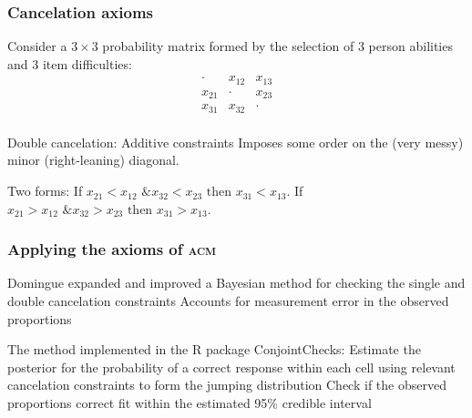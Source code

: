 \documentclass[10pt,serif,professionalfont]{beamer}
\begin{document}
\begin{frame} 
    \frametitle{Cancelation axioms}

    Consider a $3 \times 3$ probability matrix formed by the selection of 3 person abilities and 3 item difficulties:
    \[
    \begin{array}{ccc}
      \cdot&x_{12} &x_{13}  \\
      x_{21}&\cdot&x_{23} \\
      x_{31} & x_{32}&\cdot\\
    \end{array}
    \]

    \begin{outline}
        \1 Double cancelation: Additive constraints 
            \2 Imposes some order on the (very messy) minor (right-leaning) diagonal.  
        
        \vspace{0.1cm}
            
        \1 Two forms:
            \2 If $x_{21}<x_{12} \text{ \& } x_{32}<x_{23} \text{ then } x_{31}<x_{13}$.
            \2 If $x_{21}>x_{12} \text{ \& } x_{32}>x_{23} \text{ then } x_{31}>x_{13}$.

    \end{outline}

\end{frame}

\begin{frame}
    \frametitle{Applying the axioms of \textsc{acm}}

    \begin{outline}
        \1 Domingue expanded and improved a Bayesian method for checking the single and double cancelation constraints
            \2 Accounts for measurement error in the observed proportions

        \vspace{0.25cm}
        
        \1 The method implemented in the R package ConjointChecks: 
            \2 Estimate the posterior for the probability of a correct response within each cell using relevant cancelation constraints to form the jumping distribution
            \2 Check if the observed proportions correct fit within the estimated 95\% credible interval

    \end{outline}

\end{frame}
\end{document}

